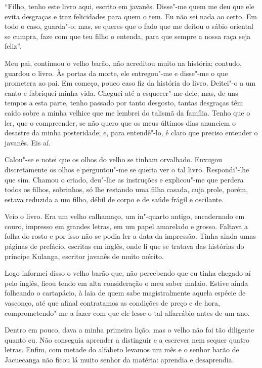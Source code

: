 ``Filho, tenho este livro aqui, escrito em javanês. Disse"-me quem me deu
que ele evita desgraças e traz felicidades para quem o tem. Eu não sei
nada ao certo. Em todo o caso, guarda"-o; mas, se queres que o fado que
me deitou o sábio oriental se cumpra, faze com que teu filho o entenda,
para que sempre a nossa raça seja feliz''.

Meu pai, continuou o velho barão, não acreditou muito na história;
contudo, guardou o livro. Às portas da morte, ele entregou"-me e disse"-me
o que prometera ao pai. Em começo, pouco caso fiz da história do livro.
Deitei"-o a um canto e fabriquei minha vida. Cheguei até a esquecer"-me
dele; mas, de uns tempos a esta parte, tenho passado por tanto desgosto,
tantas desgraças têm caído sobre a minha velhice que me lembrei do
talismã da família. Tenho que o ler, que o compreender, se não quero que
os meus últimos dias anunciem o desastre da minha posteridade; e, para
entendê"-lo, é claro que preciso entender o javanês. Eis aí.

Calou"-se e notei que os olhos do velho se tinham orvalhado. Enxugou
discretamente os olhos e perguntou"-me se queria ver o tal livro.
Respondi"-lhe que sim. Chamou o criado, deu"-lhe as instruções e
explicou"-me que perdera todos os filhos, sobrinhos, só lhe restando uma
filha casada, cuja prole, porém, estava reduzida a um filho, débil de
corpo e de saúde frágil e oscilante.

Veio o livro. Era um velho calhamaço, um in"-quarto antigo, encadernado
em couro, impresso em grandes letras, em um papel amarelado e grosso.
Faltava a folha do rosto e por isso não se podia ler a data da
impressão. Tinha ainda umas páginas de prefácio, escritas em inglês,
onde li que se tratava das histórias do príncipe Kulanga, escritor
javanês de muito mérito.

Logo informei disso o velho barão que, não percebendo que eu tinha
chegado aí pelo inglês, ficou tendo em alta consideração o meu saber
malaio. Estive ainda folheando o cartapácio, à laia de quem sabe
magistralmente aquela espécie de vasconço, até que afinal contratamos as
condições de preço e de hora, comprometendo"-me a fazer com que ele lesse
o tal alfarrábio antes de um ano.

Dentro em pouco, dava a minha primeira lição, mas o velho não foi tão
diligente quanto eu. Não conseguia aprender a distinguir e a escrever
nem sequer quatro letras. Enfim, com metade do alfabeto levamos um mês e
o senhor barão de Jacuecanga não ficou lá muito senhor da matéria:
aprendia e desaprendia.

